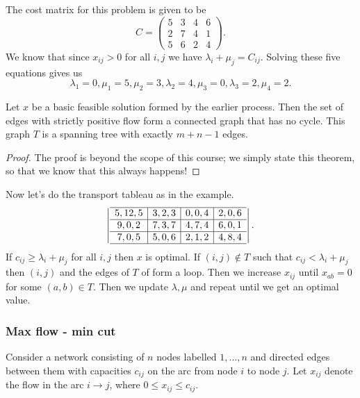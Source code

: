 \documentclass[a4paper]{scrartcl}
\begin{document}
The cost matrix for this problem is given to be \[
C=\begin{pmatrix} 5&3&4&6\\2&7&4&1 \\5&6&2&4 \end{pmatrix}
.\] We know that since $x_{ij}>0$ for all $i,j$ we have $\lambda_{i}+\mu_{j}=C_{ij}$. Solving these five equations gives us \[
\lambda_1 =0, \mu_1 =5, \mu_2 =3, \lambda_2 =4, \mu_3 =0, \lambda_3 =2, \mu_4 =2
.\] 
\begin{theorem}
	 Let $x$ be a basic feasible solution formed by the earlier process. Then the set of edges with strictly positive flow form a connected graph that has no cycle. This graph $T$ is a spanning tree with exactly $m+n-1$ edges.
\end{theorem}
\begin{proof}
	 The proof is beyond the scope of this course; we simply state this theorem, so that we know that this always happens!
\end{proof}
Now let's do the transport tableau as in the example. 
\[
\left|
	\begin{array}{c|c|c|c}
		\hline
		5 , 12 , 5 & 3,2, 3& 0,0, 4& 2,0,6\\
		\hline
		9,0,2&7,3,7&4,7,4&6,0,1\\
		\hline
		7,0,5&5,0,6&2,1,2&4,8,4\\
		\hline
	\end{array}
\right|
.\] 
If $c_{ij} \geq \lambda_{i}+\mu_{j}$ for all $i,j$ then $x$ is optimal. If $(i,j) \notin T$ such that $c_{ij}<\lambda_{i}+\mu_{j}$ then $(i,j)$ and the edges of $T$ of form a loop. Then we increase $x_{ij}$ until $x_{ab}=0$ for some $(a,b) \in T$. Then we update $\lambda, \mu$ and repeat until we get an optimal value. 
\subsubsection{Max flow - min cut}
Consider a network consisting of $n$ nodes labelled $1, \ldots ,n$ and directed edges between them with capacities $c_{ij}$ on the arc from node $i$ to node $j$. Let $x_{ij}$ denote the flow in
the arc $i \rightarrow j$, where $0 \leq x_{ij} \leq c_{ij}.$
\end{document}
